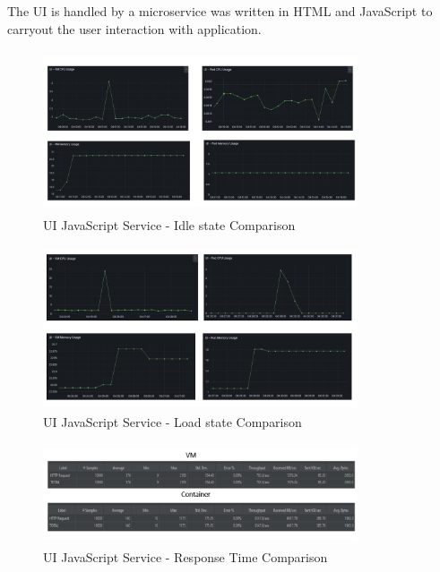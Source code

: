 The UI is handled by a microservice was written in HTML and JavaScript to carryout the user interaction with application. 
\begin{figure}[!h]
    \centering
    \includegraphics[width=9.3cm, height=4.8cm]{images/ui-cpu-idle-comp.png}
    \caption{UI JavaScript Service - Idle state Comparison}
\end{figure} 
\begin{figure}[!h]
    \centering
    \includegraphics[width=9.3cm, height=4.8cm]{images/ui-cpu-load-comp.png}
    \caption{UI JavaScript Service - Load state Comparison}
\end{figure}
\begin{figure}[!h]
    \centering
    \includegraphics[width=9.3cm, height=3cm]{images/ui-response-comp.png}
    \caption{UI JavaScript Service - Response Time Comparison}
\end{figure}
